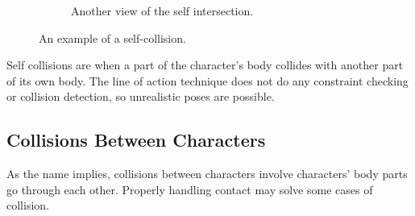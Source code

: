 \begin{figure}[h!]
\begin{subfigure}[b!]{0.45\textwidth}
                \label{fig:self1}
                \caption{Another view of the self intersection.}
        \end{subfigure}%
        \caption{An example of a self-collision.}
	\label{fig:selfcollisions}
\end{figure}

Self collisions are when a part of the character's body collides with another part of its own body. The line of action technique does not do any constraint checking or collision detection, so unrealistic poses are possible. 

\subsection{Collisions Between Characters}
As the name implies, collisions between characters involve characters' body parts go through each other. Properly handling contact may solve some cases of collision.


